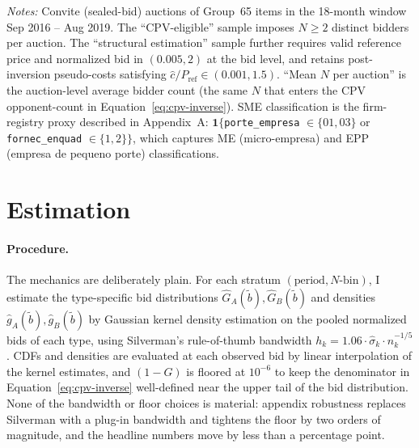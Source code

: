 \documentclass[12pt]{article}
\begin{document}
\begin{table}[htbp]
\begin{threeparttable}
\begin{tabular}{lrrr}
\bottomrule
\end{tabular}
\begin{tablenotes}
\footnotesize
\item \textit{Notes:} Convite (sealed-bid) auctions of Group~65
items in the 18-month window Sep 2016 -- Aug 2019. The
``CPV-eligible'' sample imposes $N \ge 2$ distinct bidders per
auction. The ``structural estimation'' sample further requires
valid reference price and normalized bid in $(0.005, 2)$ at the
bid level, and retains post-inversion pseudo-costs satisfying
$\hat c / P_{\text{ref}} \in (0.001, 1.5)$. ``Mean $N$ per
auction'' is the auction-level average bidder count (the same
$N$ that enters the CPV opponent-count in
Equation~\ref{eq:cpv-inverse}). SME classification is the
firm-registry proxy described in Appendix~A:
$\mathbf{1}\{$\texttt{porte\_empresa} $\in \{01, 03\}$ or
\texttt{fornec\_enquad} $\in \{1, 2\}\}$, which captures ME
(micro-empresa) and EPP (empresa de pequeno porte)
classifications.
\end{tablenotes}
\end{threeparttable}
\end{table}

\section{Estimation}
\label{sec:estimation}

\paragraph{Procedure.}
The mechanics are deliberately plain. For each stratum
$(\text{period}, N\text{-bin})$, I estimate the type-specific bid
distributions $\hat G_A(\tilde b), \hat G_B(\tilde b)$ and
densities $\hat g_A(\tilde b), \hat g_B(\tilde b)$ by Gaussian
kernel density estimation on the pooled normalized bids of each
type, using Silverman's rule-of-thumb bandwidth
$h_k = 1.06 \cdot \hat\sigma_k \cdot n_k^{-1/5}$. CDFs and
densities are evaluated at each observed bid by linear
interpolation of the kernel estimates, and $(1-G)$ is floored at
$10^{-6}$ to keep the denominator in Equation~\eqref{eq:cpv-inverse}
well-defined near the upper tail of the bid distribution. None
of the bandwidth or floor choices is material: appendix
robustness replaces Silverman with a plug-in bandwidth and
tightens the floor by two orders of magnitude, and the headline
numbers move by less than a percentage point.
\end{document}

